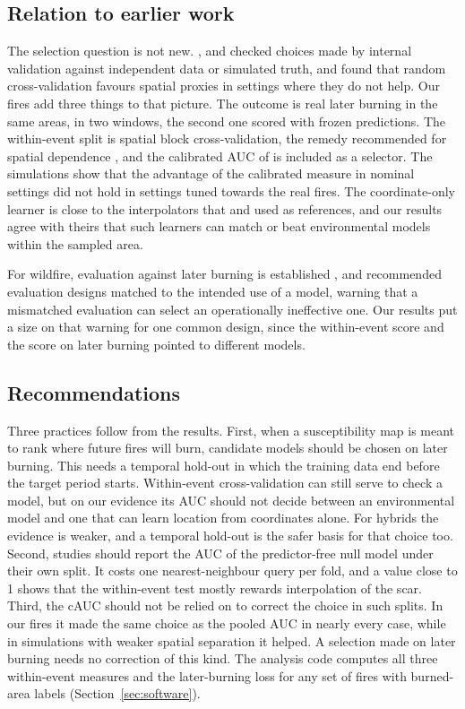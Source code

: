 \documentclass[preprint,12pt,authoryear]{elsarticle}
\begin{document}
\subsection{Relation to earlier work}
\label{sec:disc-lit}

The selection question is not new. \citet{Baker2024}, \citet{Finn2024} and \citet{Mila2024} checked choices made by internal validation against independent data or simulated truth, and \citet{Mila2024} found that random cross-validation favours spatial proxies in settings where they do not help. Our fires add three things to that picture. The outcome is real later burning in the same areas, in two windows, the second one scored with frozen predictions. The within-event split is spatial block cross-validation, the remedy recommended for spatial dependence \citep{Roberts2017}, and the calibrated AUC of \citet{Hijmans2012} is included as a selector. The simulations show that the advantage of the calibrated measure in nominal settings did not hold in settings tuned towards the real fires. The coordinate-only learner is close to the interpolators that \citet{Bahn2007} and \citet{Ploton2020} used as references, and our results agree with theirs that such learners can match or beat environmental models within the sampled area.

For wildfire, evaluation against later burning is established \citep{Verde2010,Trucchia2022,Moran2025}, and \citet{PhelpsWoolford2021} recommended evaluation designs matched to the intended use of a model, warning that a mismatched evaluation can select an operationally ineffective one. Our results put a size on that warning for one common design, since the within-event score and the score on later burning pointed to different models.

\subsection{Recommendations}
\label{sec:disc-rec}

Three practices follow from the results. First, when a susceptibility map is meant to rank where future fires will burn, candidate models should be chosen on later burning. This needs a temporal hold-out in which the training data end before the target period starts. Within-event cross-validation can still serve to check a model, but on our evidence its AUC should not decide between an environmental model and one that can learn location from coordinates alone. For hybrids the evidence is weaker, and a temporal hold-out is the safer basis for that choice too. Second, studies should report the AUC of the predictor-free null model under their own split. It costs one nearest-neighbour query per fold, and a value close to 1 shows that the within-event test mostly rewards interpolation of the scar. Third, the cAUC should not be relied on to correct the choice in such splits. In our fires it made the same choice as the pooled AUC in nearly every case, while in simulations with weaker spatial separation it helped. A selection made on later burning needs no correction of this kind. The analysis code computes all three within-event measures and the later-burning loss for any set of fires with burned-area labels (Section~\ref{sec:software}).
\end{document}
